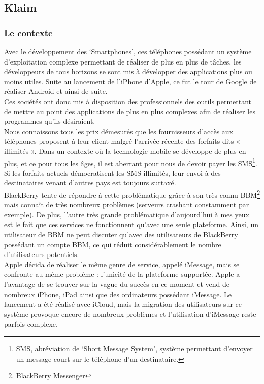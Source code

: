 \documentclass{article}
\begin{document}
	
\subsection{Klaim}
\subsubsection{Le contexte}
	Avec le développement des ‘Smartphones’, ces téléphones possédant un système d’exploitation complexe permettant de réaliser de plus en plus de tâches, les développeurs de tous horizons se sont mis à développer des applications plus ou moins utiles. Suite au lancement de l’iPhone d’Apple, ce fut le tour de Google de réaliser Android et ainsi de suite.\\
	
	Ces sociétés ont donc mis à disposition des professionnels des outils permettant de mettre au point des applications de plus en plus complexes afin de réaliser les programmes qu'ils désiraient. \\
	
	Nous connaissons tous les prix démesurés que les fournisseurs d’accès aux téléphones proposent à leur client malgré l’arrivée récente des forfaits dits « illimités ». Dans un contexte où la technologie mobile se développe de plus en plus, et ce pour tous les âges, il est aberrant  pour nous de devoir payer les SMS\footnote{SMS, abréviation de ‘Short Message System’, système permettant d’envoyer un message court sur le téléphone d’un destinataire.}. Si les forfaits actuels démocratisent les SMS illimités, leur envoi à des destinataires venant d’autres pays est toujours surtaxé. \\
	
	BlackBerry tente de répondre à cette problématique grâce à son très connu BBM\footnote{BlackBerry Messenger} mais connaît de très nombreux problèmes (serveurs crashant constamment par exemple). De plus, l’autre très grande problématique d’aujourd’hui à mes yeux est le fait que ces services ne fonctionnent qu’avec une seule plateforme. Ainsi, un utilisateur de BBM ne peut discuter qu’avec des utilisateurs de BlackBerry possédant un compte BBM, ce qui réduit considérablement le nombre d'utilisateurs potentiels. \\
	
	Apple décida de réaliser le même genre de service, appelé iMessage, mais se confronte au même problème : l’unicité de la plateforme supportée. Apple a l'avantage de se trouver sur la vague du succès en ce moment et vend de nombreux iPhone, iPad ainsi que des ordinateurs possédant iMessage. Le lancement a été réalisé avec iCloud, mais la migration des utilisateurs sur ce système provoque encore de nombreux problèmes et l'utilisation d'iMessage reste parfois complexe.\\
	
\end{document}

